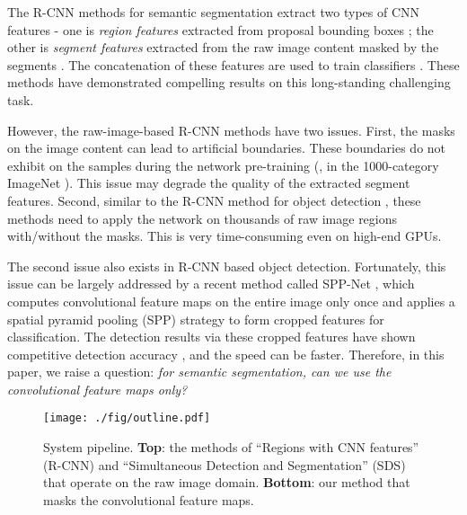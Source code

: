 \documentclass[10pt,twocolumn,letterpaper]{article}
\begin{document}
The R-CNN methods \cite{girshick2013rich,hariharan2014simultaneous} for semantic segmentation extract two types of CNN features - one is \emph{region features} \cite{girshick2013rich} extracted from proposal bounding boxes \cite{uijlings2013selective}; the other is \emph{segment features} extracted from the raw image content masked by the segments \cite{hariharan2014simultaneous}.
The concatenation of these features are used to train classifiers \cite{hariharan2014simultaneous}. These methods have demonstrated compelling results on this long-standing challenging task.

However, the raw-image-based R-CNN methods \cite{girshick2013rich,hariharan2014simultaneous} have two issues. First, the masks on the image content can lead to artificial boundaries. These boundaries do not exhibit on the samples during the network pre-training (\eg, in the 1000-category ImageNet \cite{deng2009imagenet}). This issue may degrade the quality of the extracted segment features. Second, similar to the R-CNN method for object detection \cite{girshick2013rich}, these methods need to apply the network on thousands of raw image regions with/without the masks. This is very time-consuming even on high-end GPUs.

The second issue also exists in R-CNN based object detection. Fortunately, this issue can be largely addressed by a recent method called SPP-Net \cite{he2014spatial}, which computes convolutional feature maps on the entire image only once and applies a spatial pyramid pooling (SPP) strategy to form cropped features for classification. The detection results via these cropped features have shown competitive detection accuracy \cite{he2014spatial}, and the speed can be  faster. Therefore, in this paper, we raise a question: \emph{for semantic segmentation, can we use the convolutional feature maps only?}

\begin{figure*}
  \centering
    \texttt{[image: ./fig/outline.pdf]}\\
\caption{System pipeline. \textbf{Top}: the methods of ``Regions with CNN features'' (R-CNN) \cite{girshick2013rich} and ``Simultaneous Detection and Segmentation'' (SDS) \cite{hariharan2014simultaneous} that operate on the raw image domain. \textbf{Bottom}: our method that masks the convolutional feature maps.}
\label{fig:algorithm_outline}
\end{figure*}
\end{document}
